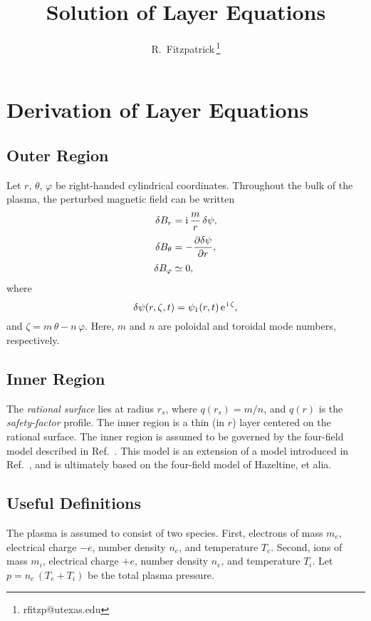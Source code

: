 \documentclass[12pt,prb,aps,notitlepage]{revtex4-1}
\begin{document}
\title{Solution of Layer Equations}
\author{R.~Fitzpatrick\,\footnote{rfitzp@utexas.edu}}
\begin{abstract}
\end{abstract}
\maketitle

\section{Derivation of Layer Equations}
\subsection{Outer Region}
Let $r$, $\theta$, $\varphi$ be right-handed cylindrical coordinates. 
Throughout the bulk of the plasma, 
 the perturbed magnetic field   can be written\,\cite{err1,book}
\begin{align}
\delta B_r &= {\rm i}\,\frac{m}{r}\,\delta\psi,\label{e1}\\[0.5ex]
\delta B_\theta &= -\frac{\partial\delta \psi}{\partial r},\\[0.5ex]
\delta B_\varphi&\simeq 0,\label{e5}
\end{align}
where 
\begin{equation}\label{e2}
\delta\psi(r,\zeta,t) = \psi_1(r,t)\,{\rm e}^{\,{\rm i}\,\zeta},
\end{equation}
and $\zeta=m\,\theta-n\,\varphi$. Here, $m$ and $n$ are poloidal and toroidal mode numbers, respectively. 

\subsection{Inner Region}
The {\em rational surface}\/ lies at radius $r_s$, where $q(r_s)=m/n$, and $q(r)$
is the {\em safety-factor}\/ profile. The inner region is a thin (in $r$) layer centered on the rational surface. 
The inner region is assumed to be governed by the  four-field model described in Ref.~. This
model is an extension of a model introduced in Ref.~, and is ultimately based on the four-field model of Hazeltine, et alia.\cite{hkm}

\subsection{Useful Definitions}
The plasma is assumed to consist of two species. First, electrons of mass $m_e$, electrical charge $-e$, 
number density $n_e$, and temperature $T_e$.  Second, ions of mass $m_i$, electrical charge $+e$,  
number density $n_e$, and temperature $T_i$. Let $p=n_e\,(T_e+T_i)$ be the total plasma pressure. 
\end{document}
